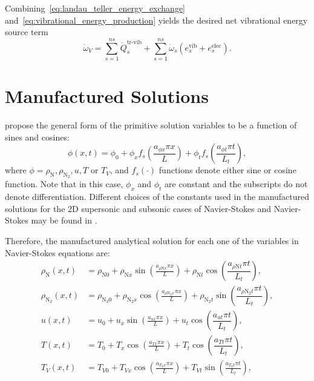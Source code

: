 \documentclass[10pt]{article}
\begin{document}
Combining~\eqref{eq:landau_teller_energy_exchange} and~\eqref{eq:vibrational_energy_production} yields the desired net vibrational energy source term
\begin{equation}
  \dot{\omega}_V = \sum_{s=1}^{ns} \dot{Q}^{\text{tr-vib}}_s + \sum_{s=1}^{ns} \dot{\omega}_s\left(e^{\text{vib}}_{s} + e^{\text{elec}}_{s}\right).
\end{equation}

\section{Manufactured Solutions}

\citet{Roy2002} propose the general form of the primitive solution variables to be a function of sines and cosines:
\begin{equation}
 \label{eq:manufactured01}
 \phi (x,t) = \phi_0+ \phi_x f_s\left(\frac{a_{\phi x} \pi x}{L}\right) + \phi_t f_s\left(\frac{a_{\phi t} \pi t}{L_t}\right),
\end{equation}
where $\phi=\rho_{\text{N}},\rho_{\text{N}_2}, u, T$ or $T_V$, and $f_s(\cdot)$ functions denote either sine or cosine function. Note that in this case, $\phi_x$ and $\phi_t$  are constant and the subscripts do not denote differentiation. Different choices of the constants used in the manufactured solutions for the 2D supersonic and subsonic cases of Navier-Stokes and Navier-Stokes may be found in \citet{Roy2002}.

Therefore, the manufactured analytical solution for each one of the variables in Navier-Stokes equations are:
\begin{equation}
\begin{split}
\label{eq:manufactured02}
\rho_{\text{N}}(x,t) &= \rho_{\text{N}0} + \rho_{\text{N}x} \sin\left(\frac{a_{  \rho \text{N} x }\pi x}{L}\right)+\rho_{\text{N}t} \cos\left( \dfrac{ a_{ \rho \text{N} t}  \pi t}{L_t}\right),\\
\rho_{\text{N}_2}(x,t) &= \rho_{\text{N}_2 0}+ \rho_{\text{N}_2 x} \cos\left(\frac{a_{ \rho \text{N}_2 x } \pi x}{L}\right)+\rho_{\text{N}_2 t} \sin\left( \dfrac{ a_{ \rho \text{N}_2 t}\pi t}{L_t}\right),\\
u(x,t) &=  u_{0}+u_{x} \sin\left(\frac{a_{u x} \pi x}{L}\right)+ u_t \cos\left( \dfrac{ a_{ut}\pi t}{L_t}\right),\\
T(x,t) &=T_{0}+T_{x} \cos\left(\frac{a_{T x} \pi x}{L}\right)+ T_t \cos\left( \dfrac{ a_{Tt} \pi t}{L_t}\right),\\
T_V(x,t) &= T_{V0}+T_{Vx} \cos\left(\frac{a_{T_V x} \pi x}{L}\right)+T_{Vt}\sin\left(\frac{a_{T_V t} \pi t}{L_t}\right),\\
\end{split}
\end{equation}
\end{document}
